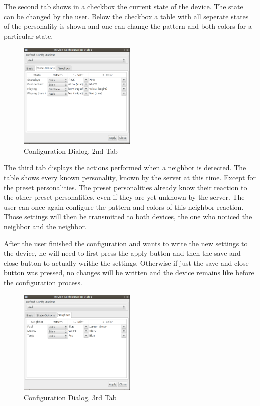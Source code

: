 The second tab shows in a checkbox the current state of the device. The state can be changed by the user. Below the checkbox a table with all seperate states of the personality is shown and one can change the pattern and both colors for a particular state. 


\begin{figure}[h!]
 \centering
 \includegraphics[width= 0.5\textwidth, clip=true  ,keepaspectratio=true]{./pic/java-server-config02.png}
 \caption{Configuration Dialog, 2nd Tab}
 \label{fig:java-server-config01}
\end{figure}


The third tab displays the actions performed when a neighbor is detected. The table shows every known personality, known by the server at this time. Except for the preset personalities. The preset personalities already know their reaction to the other preset personalities, even if they are yet unknown by the server.
The user can once again configure the pattern and colors of this neighbor reaction. Those settings will then be transmitted to both devices, the one who noticed the neighbor and the neighbor.

After the user finished the configuration and wants to write the new settings to the device, he will need to first press the apply button and then the save and close button to actually writhe the settings. Otherwise if just the save and close button was pressed, no changes will be written and the device remains like before the configuration process.
\begin{figure}[h!]
 \centering
 \includegraphics[width= 0.5\textwidth, clip=true  ,keepaspectratio=true]{./pic/java-server-config03.png}
 \caption{Configuration Dialog, 3rd Tab}
 \label{fig:java-server-config01}
\end{figure}

